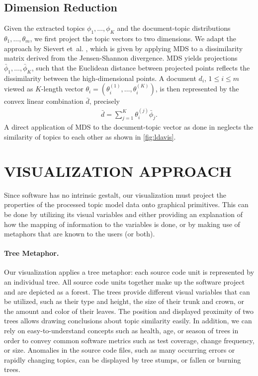 \documentclass[a4paper,twoside]{article}
\begin{document}
\subsection{Dimension Reduction}
Given the extracted topics $\phi_1, \dots, \phi_K$ and the document-topic distributions $\theta_1, \dots, \theta_m$, we first project the topic vectors to two dimensions.
We adapt the approach by Sievert et~al. \cite{sievert2014ldavis}, which is given by applying \ac{MDS} to a dissimilarity matrix derived from the Jensen-Shannon divergence.
\ac{MDS} yields projections $\bar{\phi}_1, \dots, \bar{\phi}_K$, such that the Euclidean distance between projected points reflects the dissimilarity between the high-dimensional points.
A document $d_i$, $ 1\le i\le m$ viewed as $K$-length vector $\theta_i = (\theta_i^{(1)}, \dots, \theta_i^{(K)})$, is then represented by the convex linear combination $\bar{d}$, precisely
\begin{align}
    \bar{d} = \sum \limits_{j=1}^{K} \theta_i^{(j)} \bar{\phi}_j.
\end{align}
A direct application of \ac{MDS} to the document-topic vector as done in \cite{linstead09sourcerer} neglects the similarity of topics to each other as shown in \autoref{fig:ldavis}.

\section{\uppercase{Visualization Approach}}
\label{sec:conceptvisualization}
\noindent 
Since software has no intrinsic gestalt, our visualization must project the properties of the processed topic model data onto graphical primitives. 
This can be done by utilizing its visual variables and either providing an explanation of how the mapping of information to the variables is done, or by making use of metaphors that are known to the users (or both).

\paragraph{Tree Metaphor.} 
Our visualization applies a tree metaphor: each source code unit is represented by an individual tree. 
All source code units together make up the software project and are depicted as a forest.
The trees provide different visual variables that can be utilized, such as their type and height, the size of their trunk and crown, or the amount and color of their leaves.
The position and displayed proximity of two trees allows drawing conclusions about topic similarity easily.
In addition, we can rely on easy-to-understand concepts such as health, age, or season of trees in order to convey common software metrics such as test coverage, change frequency, or size.
Anomalies in the source code files, such as many occurring errors or rapidly changing topics, can be displayed by tree stumps, or fallen or burning trees.
\end{document}
